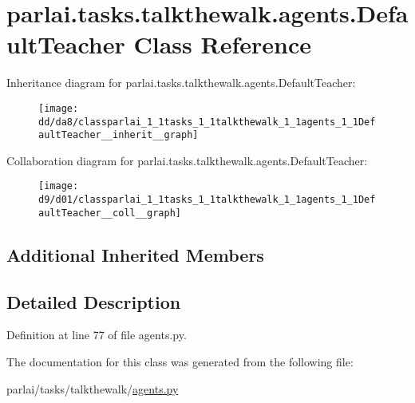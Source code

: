 \hypertarget{classparlai_1_1tasks_1_1talkthewalk_1_1agents_1_1DefaultTeacher}{}\section{parlai.\+tasks.\+talkthewalk.\+agents.\+Default\+Teacher Class Reference}
\label{classparlai_1_1tasks_1_1talkthewalk_1_1agents_1_1DefaultTeacher}


Inheritance diagram for parlai.\+tasks.\+talkthewalk.\+agents.\+Default\+Teacher\+:\nopagebreak
\begin{figure}[H]
\begin{center}
\leavevmode
\texttt{[image: dd/da8/classparlai\_1\_1tasks\_1\_1talkthewalk\_1\_1agents\_1\_1DefaultTeacher\_\_inherit\_\_graph]}
\end{center}
\end{figure}


Collaboration diagram for parlai.\+tasks.\+talkthewalk.\+agents.\+Default\+Teacher\+:\nopagebreak
\begin{figure}[H]
\begin{center}
\leavevmode
\texttt{[image: d9/d01/classparlai\_1\_1tasks\_1\_1talkthewalk\_1\_1agents\_1\_1DefaultTeacher\_\_coll\_\_graph]}
\end{center}
\end{figure}
\subsection*{Additional Inherited Members}


\subsection{Detailed Description}


Definition at line 77 of file agents.\+py.



The documentation for this class was generated from the following file\+:\begin{DoxyCompactItemize}
\item 
parlai/tasks/talkthewalk/\hyperlink{parlai_2tasks_2talkthewalk_2agents_8py}{agents.\+py}\end{DoxyCompactItemize}
